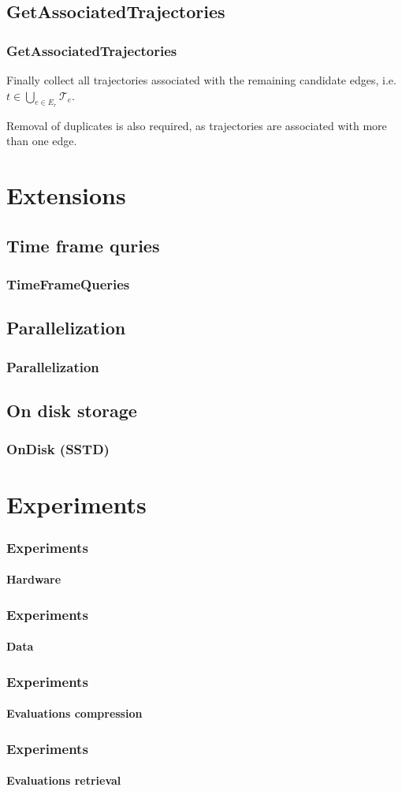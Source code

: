 \documentclass{beamer}
\newcommand{\getAssociatedTrajectories}{GetAssociatedTrajectories\xspace}
\begin{document}
\subsection{\getAssociatedTrajectories}
\begin{frame}
	\frametitle{\getAssociatedTrajectories}
	Finally collect all trajectories associated with the remaining candidate edges, i.e. $t \in \bigcup_{e \in E_r} \mathcal{T}_e $.\pause

	Removal of duplicates is also required, as trajectories are associated with more than one edge.
\end{frame}

\section{Extensions}

\subsection{Time frame quries}
\begin{frame}
	\frametitle{TimeFrameQueries}
\end{frame}

\subsection{Parallelization}
\begin{frame}
	\frametitle{Parallelization}
\end{frame}

\subsection{On disk storage}
\begin{frame}
	\frametitle{OnDisk (SSTD)}
\end{frame}

\section{Experiments}

\begin{frame}
	\frametitle{Experiments}
	\framesubtitle{Hardware}
\end{frame}

\begin{frame}
	\frametitle{Experiments}
	\framesubtitle{Data}
\end{frame}

\begin{frame}
	\frametitle{Experiments}
	\framesubtitle{Evaluations compression}
\end{frame}

\begin{frame}
	\frametitle{Experiments}
	\framesubtitle{Evaluations retrieval}
\end{frame}
\end{document}
